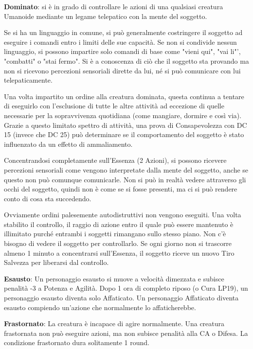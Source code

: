 \documentclass[a4paper,11pt,twoside,openany]{book}
\begin{document}
{\textbf{Dominato}: si è in grado di controllare le azioni di una qualsiasi creatura Umanoide mediante un legame telepatico con la mente del soggetto.

Se si ha un linguaggio in comune, si può generalmente costringere il soggetto ad eseguire i comandi entro i limiti delle sue capacità. Se non si condivide nessun linguaggio, si possono impartire solo comandi di base come "vieni qui", "vai li"', "combatti" o "stai fermo". Si è a conoscenza di ciò che il soggetto sta provando ma non si ricevono percezioni sensoriali dirette da lui, né si può comunicare con lui telepaticamente.

Una volta impartito un ordine alla creatura dominata, questa continua a tentare di eseguirlo con l'esclusione di tutte le altre attività ad eccezione di quelle necessarie per la sopravvivenza quotidiana (come mangiare, dormire e così via). Grazie a questo limitato spettro di attività, una prova di Consapevolezza con DC 15 (invece che DC 25) può determinare se il comportamento del soggetto è stato influenzato da un effetto di ammaliamento.

Concentrandosi completamente sull'Essenza (2 Azioni), si possono ricevere percezioni sensoriali come vengono interpretate dalla mente del soggetto, anche se questo non può comunque comunicarle. Non si può in realtà vedere attraverso gli occhi del soggetto, quindi non è come se si fosse presenti, ma ci si può rendere conto di cosa sta succedendo. 

Ovviamente ordini palesemente autodistruttivi non vengono eseguiti. Una volta stabilito il controllo, il raggio di azione entro il quale può essere mantenuto è illimitato purché entrambi i soggetti rimangano sullo stesso piano. Non c'è bisogno di vedere il soggetto per controllarlo. Se ogni giorno non si trascorre almeno 1 minuto a concentrarsi sull'Essenza, il soggetto riceve un nuovo Tiro Salvezza per liberarsi dal controllo.

\textbf{Esausto}: Un personaggio esausto si muove a velocità dimezzata e subisce penalità -3 a Potenza e Agilità. Dopo 1 ora di completo riposo (o Cura LP19), un personaggio esausto diventa solo Affaticato. Un personaggio Affaticato diventa esausto compiendo un'azione che normalmente lo affaticherebbe.

\textbf{Frastornato}: La creatura è incapace di agire normalmente.
Una creatura frastornata non può eseguire azioni, ma non subisce penalità alla CA o Difesa. La condizione frastornato dura solitamente 1 round.

}
\end{document}
